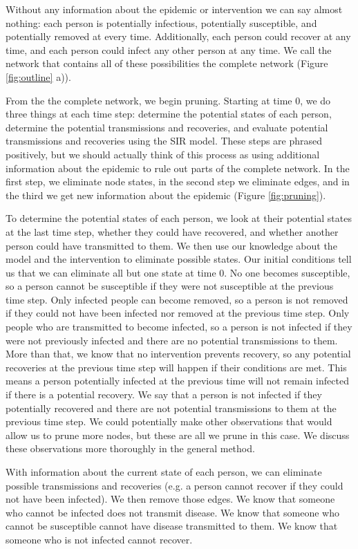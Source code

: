 \documentclass[PTRSB]{rsos}
\begin{document}
\begin{multicols}{2}
Without any information about the epidemic or intervention we can say almost nothing: each person is potentially infectious, potentially susceptible, and potentially removed at every time.
Additionally, each person could recover at any time, and each person could infect any other person at any time.
We call the network that contains all of these possibilities the complete network (Figure \ref{fig:outline} a)).

From the the complete network, we begin pruning.
Starting at time $0$, we do three things at each time step: determine the potential states of each person, determine the potential transmissions and recoveries, and evaluate potential transmissions and recoveries using the SIR model.
These steps are phrased positively, but we should actually think of this process as using additional information about the epidemic to rule out parts of the complete network.
In the first step, we eliminate node states, in the second step we eliminate edges, and in the third we get new information about the epidemic (Figure \ref{fig:pruning}).

To determine the potential states of each person, we look at their potential states at the last time step, whether they could have recovered, and whether another person could have transmitted to them.
We then use our knowledge about the model and the intervention to eliminate possible states.
Our initial conditions tell us that we can eliminate all but one state at time $0$.
No one becomes susceptible, so a person cannot be susceptible if they were not susceptible at the previous time step.
Only infected people can become removed, so a person is not removed if they could not have been infected nor removed at the previous time step.
Only people who are transmitted to become infected, so a person is not infected if they were not previously infected and there are no potential transmissions to them.
More than that, we know that no intervention prevents recovery, so any potential recoveries at the previous time step will happen if their conditions are met.
This means a person potentially infected at the previous time will not remain infected if there is a potential recovery.
We say that a person is not infected if they potentially recovered and there are not potential transmissions to them at the previous time step.
We could potentially make other observations that would allow us to prune more nodes, but these are all we prune in this case.
We discuss these observations more thoroughly in the general method.

With information about the current state of each person, we can eliminate possible transmissions and recoveries (e.g. a person cannot recover if they could not have been infected).
We then remove those edges.
We know that someone who cannot be infected does not transmit disease.
We know that someone who cannot be susceptible cannot have disease transmitted to them.
We know that someone who is not infected cannot recover.


\end{multicols}
\end{document}
